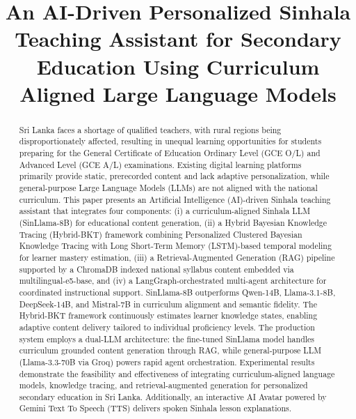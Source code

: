 \documentclass[conference]{IEEEtran}
\begin{document}

\title{An AI-Driven Personalized Sinhala Teaching Assistant for Secondary Education Using Curriculum Aligned Large Language Models}

\author{}

\maketitle

\begin{abstract}
Sri Lanka faces a shortage of qualified teachers, with rural regions being disproportionately affected, resulting in unequal learning opportunities for students preparing for the General Certificate of Education Ordinary Level (GCE O/L) and Advanced Level (GCE A/L) examinations. Existing digital learning platforms primarily provide static, prerecorded content and lack adaptive personalization, while general-purpose Large Language Models (LLMs) are not aligned with the national curriculum. This paper presents an Artificial Intelligence (AI)-driven Sinhala teaching assistant that integrates four components: (i) a curriculum-aligned Sinhala LLM (SinLlama-8B) for educational content generation, (ii) a Hybrid Bayesian Knowledge Tracing (Hybrid-BKT) framework combining Personalized Clustered Bayesian Knowledge Tracing with Long Short-Term Memory (LSTM)-based temporal modeling for learner mastery estimation, (iii) a Retrieval-Augmented Generation (RAG) pipeline supported by a ChromaDB indexed national syllabus content embedded via multilingual-e5-base, and (iv) a LangGraph-orchestrated multi-agent architecture for coordinated instructional support. SinLlama-8B outperforms Qwen-14B, Llama-3.1-8B, DeepSeek-14B, and Mistral-7B in curriculum alignment and semantic fidelity. The Hybrid-BKT framework continuously estimates learner knowledge states, enabling adaptive content delivery tailored to individual proficiency levels. The production system employs a dual-LLM architecture: the fine-tuned SinLlama model handles curriculum grounded content generation through RAG, while general-purpose LLM (Llama-3.3-70B via Groq) powers rapid agent orchestration. Experimental results demonstrate the feasibility and effectiveness of integrating curriculum-aligned language models, knowledge tracing, and retrieval-augmented generation for personalized secondary education in Sri Lanka. Additionally, an interactive AI Avatar powered by Gemini Text To Speech (TTS) delivers spoken Sinhala lesson explanations.
\end{abstract}
\end{document}
